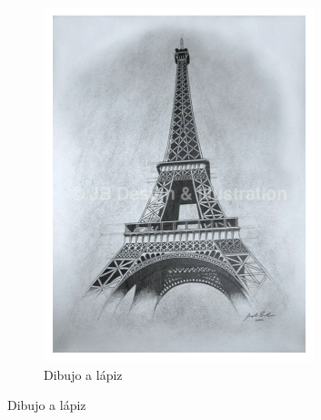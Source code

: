 \documentclass[letterpaper, 10 pt, conference]{ieeeconf}  %
\begin{document}
\begin{figure}
\begin{subfigure}{0.45\linewidth}
\includegraphics[width=\linewidth, scale=0.1]{images/torre_d.png}
    \caption{Dibujo a lápiz}
\label{fig:1a}
    \end{subfigure}


\end{figure}
\end{document}
